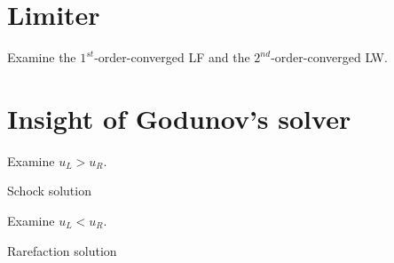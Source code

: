 \documentclass[12pt]{article}
\begin{document}
\section{Limiter}
\begin{example}
	Examine the $1^{st}$-order-converged LF and the $2^{nd}$-order-converged LW.
\end{example}

\clearpage
\section{Insight of Godunov's solver}
\begin{example}
	Examine $u_{L} > u_{R}$.
\end{example}
Schock solution

\clearpage
\begin{example}
	Examine $u_{L} < u_{R}$.
\end{example}
Rarefaction solution
\end{document}
